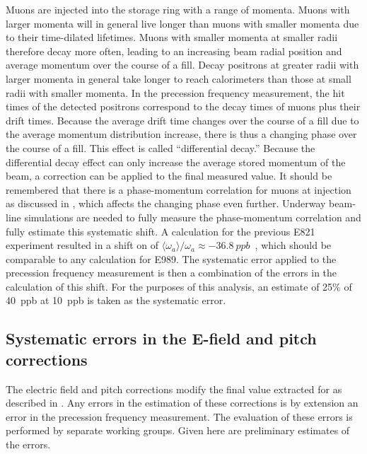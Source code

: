 Muons are injected into the storage ring with a range of momenta. Muons with larger momenta will in general live longer than muons with smaller momenta due to their time-dilated lifetimes. Muons with smaller momenta at smaller radii therefore decay more often, leading to an increasing beam radial position and average momentum over the course of a fill. Decay positrons at greater radii with larger momenta in general take longer to reach calorimeters than those at small radii with smaller momenta. In the precession frequency measurement, the hit times of the detected positrons correspond to the decay times of muons plus their drift times. Because the average drift time changes over the course of a fill due to the average momentum distribution increase, there is thus a changing phase over the course of a fill. This effect is called ``differential decay.'' Because the differential decay effect can only increase the average stored momentum of the beam, a correction can be applied to the final measured \wa value. It should be remembered that there is a phase-momentum correlation for muons at injection as discussed in , which affects the changing phase even further. Underway beam-line simulations are needed to fully measure the phase-momentum correlation and fully estimate this systematic shift. A calculation for the previous E821 experiment resulted in a shift on \wa of $\langle \omega_{a} \rangle / \omega_{a} \approx \SI{-36.8}{ppb}$~\cite{DiffDecayJason}, which should be comparable to any calculation for E989. The systematic error applied to the precession frequency measurement is then a combination of the errors in the calculation of this shift. For the purposes of this analysis, an estimate of 25\% of \SI{40}{ppb} at \SI{10}{ppb} is taken as the systematic error.





\subsection{Systematic errors in the E-field and pitch corrections}
\label{sub:EfieldPitchErrors}


The electric field and pitch corrections modify the final value extracted for \wa as described in . Any errors in the estimation of these corrections is by extension an error in the precession frequency measurement. The evaluation of these errors is performed by separate working groups. Given here are preliminary estimates of the errors. 


